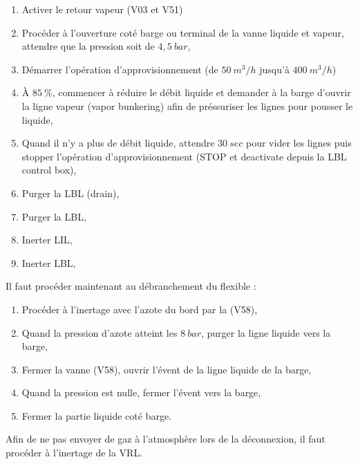 \documentclass[12pt,a4paper]{article}
\begin{document}
\begin{enumerate}[resume]
 \item Activer le retour vapeur (V03 et V51)
 \item Procéder à l'ouverture coté barge ou terminal de la vanne liquide et vapeur, attendre que la pression soit de $4,5~bar$,
 \item Démarrer l'opération d'approvisionnement (de $50~m^3/h$ jusqu'à 
$400~m^3/h$)
 \item À $85~\%$, commencer à réduire le débit liquide et demander à la barge d'ouvrir la ligne vapeur (vapor bunkering) afin de préssuriser les lignes pour pousser le liquide,
 \item Quand il n'y a plus de débit liquide, attendre $30~sec$ pour vider les lignes puis stopper l'opération d'approvisionnement (STOP et deactivate depuis la LBL control box), \item Purger la LBL (drain),
 \item Purger la LBL,
 \item Inerter LIL,
 \item Inerter LBL,
\end{enumerate}
 Il faut procéder maintenant au débranchement du flexible :
 
\begin{enumerate}[resume]
 \item Procéder à l'inertage avec l'azote du bord par la (V58), 
 \item Quand la pression d'azote atteint les $8~bar$, purger la ligne liquide 
vers la barge,
 \item Fermer la vanne (V58), ouvrir l'évent de la ligne liquide de la barge,
 \item Quand la pression est nulle, fermer l'évent vers la barge,
 \item Fermer la partie liquide coté barge.
\end{enumerate}
Afin de ne pas envoyer de gaz à l'atmosphère lors de la déconnexion, il faut 
procéder à l'inertage de la VRL.
\end{document}
